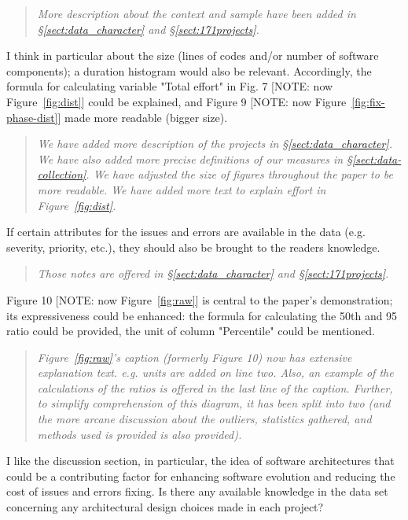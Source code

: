 \documentclass[smallcondensed]{svjour3}
\newcommand{\tion}[1]{\S\ref{sect:#1}}
\newcommand{\fig}[1]{Figure~\ref{fig:#1}}
\begin{document}
\begin{quote}{\em 
More description about the context and sample have been added in \tion{data_character} and \tion{171projects}.}\end{quote}

I think in particular about the size (lines of codes and/or
 number of software components); a duration histogram would
 also be relevant. Accordingly, the formula for calculating
 variable "Total effort" in Fig. 7 [NOTE: now \fig{dist}] could be explained, and
 Figure 9 [NOTE: now \fig{fix-phase-dist}] made more readable (bigger size).
 
 \begin{quote}{\em We have added more description of the projects in \tion{data_character}. We have also added more precise definitions of our measures in \tion{data-collection}. We have adjusted the size of figures throughout the paper to be more readable. We have added more text 
 to explain {\em effort} in \fig{dist}.}\end{quote}

 
If certain attributes for the issues and errors are
available in the data (e.g. severity, priority, etc.), they
should also be brought to the readers knowledge.  
 

\begin{quote}{\em 
Those notes are offered in \tion{data_character} and \tion{171projects}.}\end{quote}

Figure 10 [NOTE: now \fig{raw}] is central to the paper's demonstration; its
expressiveness could be enhanced: the formula for calculating the 50th
and 95 ratio could be provided,  the unit of column
"Percentile" could be mentioned. 

\begin{quote}{\em
\fig{raw}'s caption (formerly Figure 10) now has extensive explanation text. e.g. units
are added on line two. Also, an example of the calculations of the ratios is offered
in the last line of the caption. Further,
to simplify comprehension of this diagram, it has been split into two
(and the more arcane discussion about the outliers, statistics gathered, and methods used is provided is also provided).}\end{quote}

I like the discussion section, in particular, the idea
of software architectures that could be a contributing
factor for enhancing software evolution and reducing the
cost of issues and errors fixing. Is there any available
knowledge in the data set concerning any architectural
design choices made in each project?  
\end{document}
